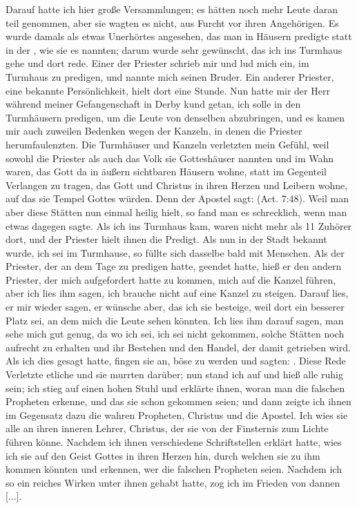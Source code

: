 Darauf hatte ich hier große Versammlungen; es hätten noch
mehr Leute daran teil genommen, aber sie wagten es nicht, aus
Furcht vor ihren Angehörigen. Es wurde damals als 
etwas
Unerhörtes angesehen, das man in Häusern predigte statt in der
, wie sie es nannten; darum wurde sehr gewünscht, das
ich ins Turmhaus gehe und dort rede. Einer der Priester schrieb
mir und lud mich ein, im Turmhaus zu predigen, und nannte
mich seinen Bruder. Ein anderer Priester, eine bekannte 
Persönlichkeit, hielt dort eine Stunde. Nun hatte mir der Herr während
meiner Gefangenschaft in Derby kund getan, ich solle in den
Turmhäusern predigen, um die Leute von denselben abzubringen,
und es kamen mir auch zuweilen Bedenken 
wegen der Kanzeln,
in denen die Priester herumfaulenzten. 
Die Turmhäuser und
Kanzeln verletzten mein Gefühl, weil sowohl die Priester als auch
das Volk sie Gotteshäuser nannten und im Wahn waren, das
Gott da in äußern sichtbaren Häusern wohne, statt im Gegenteil
Verlangen zu tragen, das Gott und Christus in ihren Herzen
und Leibern wohne, auf das sie Tempel Gottes würden. Denn
der Apostel sagt:  (Act. 7:48). Weil 
man aber diese Stätten nun einmal
heilig hielt, so fand man es schrecklich, wenn man etwas dagegen
sagte. Als ich ins Turmhaus kam, waren nicht mehr als 11 
Zuhörer dort, und der Priester hielt ihnen die Predigt. Als nun
in der Stadt bekannt wurde, ich sei im Turmhause, so füllte sich
dasselbe bald mit Menschen. Als der Priester, der an dem Tage
zu predigen hatte, geendet hatte, hieß er den andern Priester, der
mich aufgefordert hatte zu kommen, mich auf die Kanzel führen,
aber ich lies ihm sagen, ich brauche nicht auf eine Kanzel zu
steigen. Darauf lies, er mir wieder sagen, er wünsche aber, das
ich sie besteige, weil dort ein besserer Platz sei, an dem mich die
Leute sehen könnten. Ich lies ihm darauf sagen, man sehe mich
gut genug, da wo ich sei, ich sei nicht gekommen, solche Stätten
noch aufrecht zu erhalten und ihr Bestehen und den Handel, der
damit getrieben wird. Als ich dies gesagt hatte, fingen sie an,
böse zu werden und sagten: . Diese Rede Verletzte etliche und sie murrten
darüber; nun stand ich auf und hieß alle ruhig sein; ich stieg
auf einen hohen Stuhl und erklärte ihnen, woran man die falschen
Propheten erkenne, und das sie schon gekommen seien; und dann
zeigte ich ihnen im Gegensatz dazu die wahren Propheten, Christus
und die Apostel. Ich wies sie alle an ihren inneren Lehrer,
Christus, der sie von der Finsternis zum Lichte führen könne.
Nachdem ich ihnen verschiedene Schriftstellen erklärt hatte, wies
ich sie auf den Geist Gottes in ihren Herzen hin, durch welchen
sie zu ihm kommen könnten und erkennen, wer die falschen
Propheten seien. Nachdem ich so ein reiches Wirken unter ihnen
gehabt hatte, zog ich im Frieden von dannen [...].


